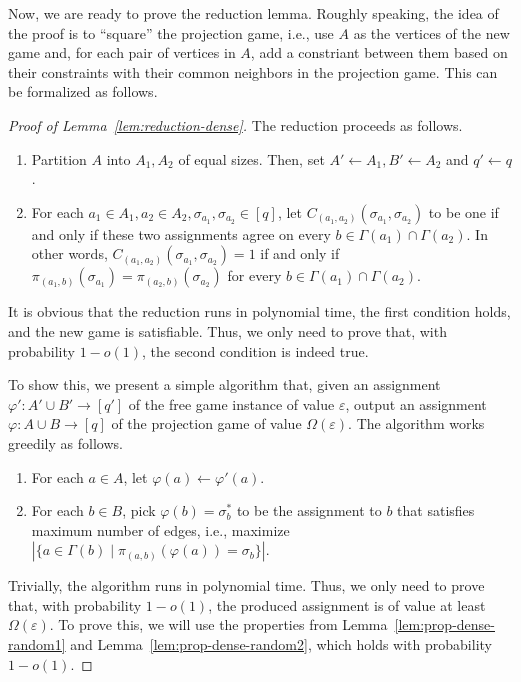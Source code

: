 \documentclass{article}
\begin{document}
Now, we are ready to prove the reduction lemma. Roughly speaking, the idea of the proof is to ``square'' the projection game, i.e., use $A$ as the vertices of the new game and, for each pair of vertices in $A$, add a constriant between them based on their constraints with their common neighbors in the projection game. This can be formalized as follows.

\begin{proof}[Proof of Lemma~\ref{lem:reduction-dense}]
The reduction proceeds as follows.
\begin{enumerate} \itemsep0em
\item Partition $A$ into $A_1, A_2$ of equal sizes. Then, set $A' \leftarrow A_1, B' \leftarrow A_2$ and $q' \leftarrow q$.
\item For each $a_1 \in A_1, a_2 \in A_2, \sigma_{a_1}, \sigma_{a_2} \in [q]$, let $C_{(a_1, a_2)}(\sigma_{a_1}, \sigma_{a_2})$ to be one if and only if these two assignments agree on every $b \in \Gamma(a_1) \cap \Gamma(a_2)$. In other words, $C_{(a_1, a_2)}(\sigma_{a_1}, \sigma_{a_2}) = 1$ if and only if $\pi_{(a_1, b)}(\sigma_{a_1}) = \pi_{(a_2, b)}(\sigma_{a_2})$ for every $b \in \Gamma(a_1) \cap \Gamma(a_2)$.
\end{enumerate}

It is obvious that the reduction runs in polynomial time, the first condition holds, and the new game is satisfiable. Thus, we only need to prove that, with probability $1 - o(1)$, the second condition is indeed true.

To show this, we present a simple algorithm that, given an assignment $\varphi': A' \cup B' \to [q']$ of the free game instance of value $\varepsilon$, output an assignment $\varphi: A \cup B \to [q]$ of the projection game of value $\Omega(\varepsilon)$. The algorithm works greedily as follows.
\begin{enumerate} \itemsep0em
\item For each $a \in A$, let $\varphi(a) \leftarrow \varphi'(a)$.
\item For each $b \in B$, pick $\varphi(b) = \sigma^*_b$ to be the assignment to $b$ that satisfies maximum number of edges, i.e., maximize $|\{a \in \Gamma(b) \mid \pi_{(a, b)}(\varphi(a)) = \sigma_b\}|$.
\end{enumerate}

Trivially, the algorithm runs in polynomial time. Thus, we only need to prove that, with probability $1 - o(1)$, the produced assignment is of value at least $\Omega(\varepsilon)$. To prove this, we will use the properties from Lemma~\ref{lem:prop-dense-random1} and Lemma~\ref{lem:prop-dense-random2}, which holds with probability $1 - o(1)$.


\end{proof}
\end{document}
